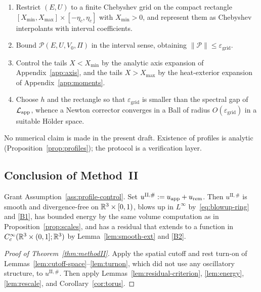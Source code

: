 \begin{construction}
\label{con:interval}
\begin{enumerate}[leftmargin=1.2em]
\item Restrict $(E,U)$ to a finite {C}hebyshev grid on the compact rectangle $[X_{\min},X_{\max}]\times[-\eta_c,\eta_c]$ with $X_{\min}>0$, and represent them as {C}hebyshev interpolants with interval coefficients.
\item Bound $\mathcal P(E,U,V_0,\Pi)$ in the interval sense, obtaining $\|\mathcal P\|\le \varepsilon_{\mathrm{grid}}$.
\item Control the tails $X<X_{\min}$ by the analytic axis expansion of Appendix~\ref{app:axis}, and the tails $X>X_{\max}$ by the heat-exterior expansion of Appendix~\ref{app:moments}.
\item Choose $h$ and the rectangle so that $\varepsilon_{\mathrm{grid}}$ is smaller than the spectral gap of $\mathcal L_{\mathrm{app}}$, whence a {N}ewton corrector converges in a {B}all of radius $O(\varepsilon_{\mathrm{grid}})$ in a suitable {H}{\"o}lder space.
\end{enumerate}
\end{construction}

No numerical claim is made in the present draft. Existence of profiles is analytic (Proposition~\ref{prop:profiles}); the protocol is a verification layer.

\subsection{Conclusion of Method~II}

\begin{proposition}
\label{prop:prelocal-II}
Grant Assumption~\ref{ass:profile-control}. Set $u^{\mathrm{II},\#}:=u_{\mathrm{app}}+u_{\mathrm{rem}}$. Then $u^{\mathrm{II},\#}$ is smooth and divergence-free on $\mathbb{R}^3\times[0,1)$, blows up in $L^\infty$ by~\eqref{eq:blowup-ring} and \ref{B1}, has bounded energy by the same volume computation as in Proposition~\ref{prop:scales}, and has a residual that extends to a function in $C_c^\infty(\mathbb{R}^3\times(0,1];\mathbb{R}^3)$ by Lemma~\ref{lem:smooth-ext} and \ref{B2}.
\end{proposition}

\begin{proof}[Proof of Theorem~\ref{thm:methodII}]
Apply the spatial cutoff and rest turn-on of Lemmas~\ref{lem:cutoff-space}--\ref{lem:turnon}, which did not use any oscillatory structure, to $u^{\mathrm{II},\#}$. Then apply Lemmas~\ref{lem:residual-criterion}, \ref{lem:energy}, \ref{lem:rescale}, and Corollary~\ref{cor:torus}.
\end{proof}

